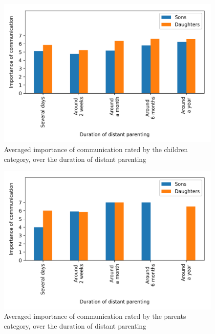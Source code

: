 \begin{figure}[ht]
    \centering
    \includegraphics[scale=0.58]{plots/plot_7.png}
    \caption{Averaged importance of communication rated by the children category, over the duration of distant parenting}
    \label{fig:plot_7}
\end{figure}

\begin{figure}[ht]
    \centering
    \includegraphics[scale=0.58]{plots/plot_6.png}
    \caption{Averaged importance of communication rated by the parents category, over the duration of distant parenting}
    \label{fig:plot_6}
\end{figure}
    
